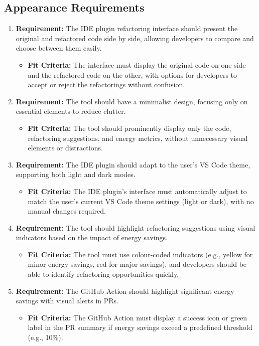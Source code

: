 \documentclass[12pt]{article}
\begin{document}
\subsection{Appearance Requirements}
\begin{enumerate}
    \item \textbf{Requirement:} The IDE plugin refactoring interface should present the original and refactored code side by side, allowing developers to compare and choose between them easily.
    \begin{itemize}[label={}]
        \item \textbf{Fit Criteria:} The interface must display the original code on one side and the refactored code on the other, with options for developers to accept or reject the refactorings without confusion.
    \end{itemize}
    \item \textbf{Requirement:} The tool should have a minimalist design, focusing only on essential elements to reduce clutter.
    \begin{itemize}[label={}]
        \item \textbf{Fit Criteria:} The tool should prominently display only the code, refactoring suggestions, and energy metrics, without unnecessary visual elements or distractions.
    \end{itemize}
    \item \textbf{Requirement:} The IDE plugin should adapt to the user’s VS Code theme, supporting both light and dark modes.
    \begin{itemize}[label={}]
        \item \textbf{Fit Criteria:} The IDE plugin’s interface must automatically adjust to match the user’s current VS Code theme settings (light or dark), with no manual changes required.
    \end{itemize}
    \item \textbf{Requirement:} The tool should highlight refactoring suggestions using visual indicators based on the impact of energy savings.
    \begin{itemize}[label={}]
        \item \textbf{Fit Criteria:} The tool must use colour-coded indicators (e.g., yellow for minor energy savings, red for major savings), and developers should be able to identify refactoring opportunities quickly.
    \end{itemize}
    \item \textbf{Requirement:} The GitHub Action should highlight significant energy savings with visual alerts in PRs.
    \begin{itemize}[label={}]
        \item \textbf{Fit Criteria:} The GitHub Action must display a success icon or green label in the PR summary if energy savings exceed a predefined threshold (e.g., 10\%).
    \end{itemize}
\end{enumerate}
\end{document}
